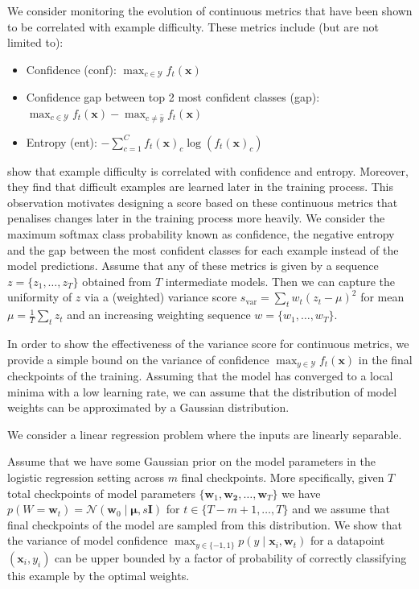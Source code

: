 We consider monitoring the evolution of continuous metrics that have been shown to be correlated with example difficulty. These metrics include (but are not limited to):
\begin{itemize}
	\item Confidence (conf): $\max _{c \in \mathcal{Y}} f_{t}(\bm{x})$
	\item Confidence gap between top 2 most confident classes (gap): $\max _{c \in \mathcal{Y}} f_{t}(\bm{x})  - \max _{c \not = \hat{y}} f_{t}(\bm{x})$
	\item Entropy (ent): $-\sum_{c=1}^C f_{t}(\bm{x})_c \log \left(f_{t}(\bm{x})_c\right)$
\end{itemize}
\cite{jiang2020characterizing} show that  
example difficulty is correlated with confidence and entropy. Moreover, they find that difficult examples are learned later in the training process. This observation motivates designing a score based on these continuous metrics that penalises changes later in the training process more heavily.
We consider the maximum softmax class probability known as confidence, the negative entropy and the gap between the most confident classes for each example instead of the model predictions. 
Assume that any of these metrics is given by a sequence $z = \{z_1,\ldots,z_T\}$ obtained from $T$ intermediate models. Then we can capture the uniformity of $z$ via a (weighted) variance score $s_\text{var} = \sum_{t} w_t (z_t - \mu)^2$ for mean $\mu = \frac{1}{T}\sum_{t} z_t$ and an increasing weighting sequence $w = \{w_1,\ldots,w_T\}$.

In order to show the effectiveness of the variance score \svar for continuous metrics, we provide a simple bound on the variance of confidence  $\max _{y \in \mathcal{Y}} f_{t}(\bm{x})$ in the final checkpoints of the training. 
Assuming that the model has converged to a local minima with a low learning rate, we can assume that the distribution of model weights can be approximated by a Gaussian distribution. 

We consider a linear regression problem where the inputs are linearly separable. 

\begin{lemma}
Assume that we have some Gaussian prior on the model parameters in the logistic regression setting across $m$ final checkpoints. More specifically, given $T$ total checkpoints of model parameters $\{\bm{w}_1, \bm{w_2}, \dots, \bm{w}_T \}$ we have $p(W = \bm{w}_t) = \mathcal{N}(\bm{w}_0 \mid \bm{\mu}, s\bm{I}) $ for $t \in \{T - m + 1, \dots, T\}$ and we assume that final checkpoints of the model are sampled from this distribution. We show that the variance of model confidence $ \max_{y \in \{-1, 1\}} p(y \mid \bm{x}_i, \bm{w}_t)$ for a datapoint $(\bm{x}_i, y_i)$ can be upper bounded by a factor of probability of correctly classifying this example by the optimal weights. 

\end{lemma}

